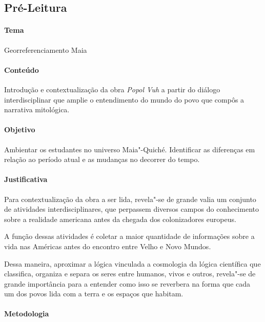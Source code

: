 \documentclass[11pt]{extarticle}
\begin{document}
\subsection{Pré-Leitura}

\paragraph{Tema} Georreferenciamento Maia

\paragraph{Conteúdo} Introdução e contextualização da obra \emph{Popol Vuh}
a partir do diálogo interdisciplinar que amplie o entendimento do mundo
do povo que compôs a narrativa mitológica.

\paragraph{Objetivo} Ambientar os estudantes no universo Maia"-Quiché.
Identificar as diferenças em relação ao período atual e as mudanças no decorrer
do tempo.


\paragraph{Justificativa} Para contextualização da obra a ser lida, revela"-se de 
grande valia um conjunto de atividades interdisciplinares, que perpassem diversos campos
do conhecimento sobre a realidade americana antes da chegada dos
colonizadores europeus. 


A função dessas atividades é coletar a maior
quantidade de informações sobre a vida nas Américas antes do encontro
entre Velho e Novo Mundos.

Dessa maneira, aproximar a lógica vinculada a cosmologia da lógica científica que classifica,
organiza e separa os seres entre humanos, vivos e outros, revela"-se de grande importância
para a entender como isso se reverbera na forma que cada um dos povos lida com a terra e os 
espaços que habitam. 

\paragraph{Metodologia} 
\end{document}
